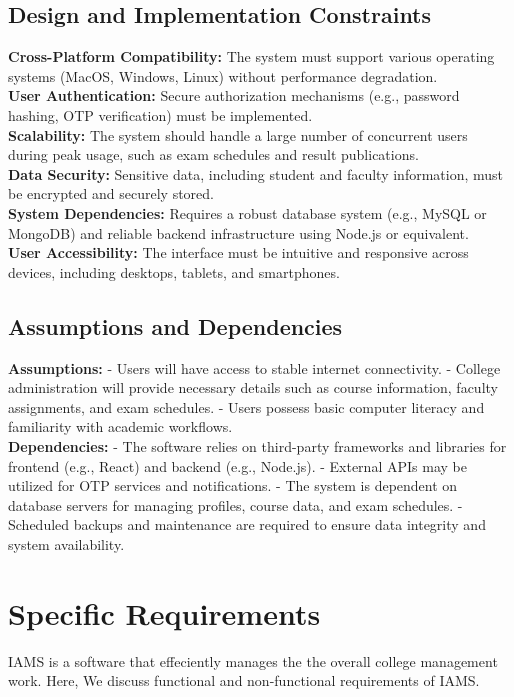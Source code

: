 \documentclass{scrreprt}
\begin{document}
\section{Design and Implementation Constraints}

\textbf{Cross-Platform Compatibility:} The system must support various operating systems (MacOS, Windows, Linux) without performance degradation.\\
\textbf{User Authentication:} Secure authorization mechanisms (e.g., password hashing, OTP verification) must be implemented.\\
\textbf{Scalability:} The system should handle a large number of concurrent users during peak usage, such as exam schedules and result publications.\\
\textbf{Data Security:} Sensitive data, including student and faculty information, must be encrypted and securely stored.\\
\textbf{System Dependencies:} Requires a robust database system (e.g., MySQL or MongoDB) and reliable backend infrastructure using Node.js or equivalent.\\
\textbf{User Accessibility:} The interface must be intuitive and responsive across devices, including desktops, tablets, and smartphones.

\section{Assumptions and Dependencies}
\textbf{Assumptions:}
    - Users will have access to stable internet connectivity.
    - College administration will provide necessary details such as course information, faculty assignments, and exam schedules.
    - Users possess basic computer literacy and familiarity with academic workflows.\\

\textbf{Dependencies:}
    - The software relies on third-party frameworks and libraries for frontend (e.g., React) and backend (e.g., Node.js).
    - External APIs may be utilized for OTP services and notifications.
    - The system is dependent on database servers for managing profiles, course data, and exam schedules.
    - Scheduled backups and maintenance are required to ensure data integrity and system availability.


\chapter{Specific Requirements}
IAMS is a software that effeciently manages the the overall college management work. Here, We discuss functional and non-functional requirements of IAMS.
\end{document}
